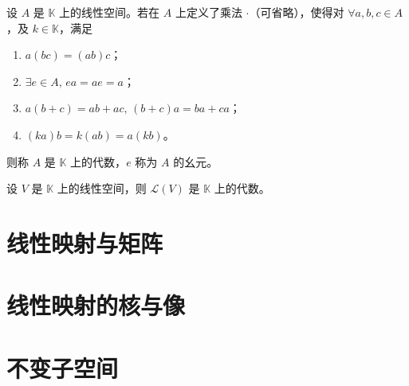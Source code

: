 \begin{definition}
  设 $A$ 是 $\mathbb{K}$ 上的线性空间。若在 $A$ 上定义了乘法 $\cdot$（可省略），使得对 $\forall a,b,c \in A$，及 $k \in \mathbb{K}$，满足
  \begin{enumerate}
    \item $a(bc) = (ab)c$；
    \item $\exists e \in A,\, ea = ae = a$；
    \item $a(b + c) = ab + ac,\, (b + c)a = ba + ca$；
    \item $(ka)b = k(ab) = a(kb)$。
  \end{enumerate}
  则称 $A$ 是 $\mathbb{K}$ 上的代数，$e$ 称为 $A$ 的幺元。
\end{definition}

\begin{theorem}
  设 $V$ 是 $\mathbb{K}$ 上的线性空间，则 $\mathcal{L}(V)$ 是 $\mathbb{K}$ 上的代数。
\end{theorem}




\section{线性映射与矩阵}







\section{线性映射的核与像}







\section{不变子空间}







\section{}






